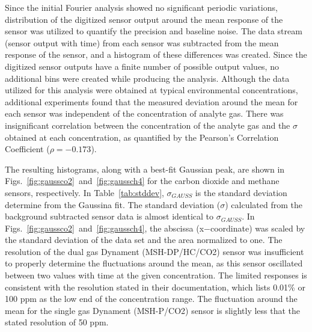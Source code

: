 \documentclass[preprint,sort&compress]{elsarticle}
\begin{document}
			Since the initial Fourier analysis showed no significant periodic variations, distribution of the digitized sensor output around the mean response of the sensor was utilized to quantify the precision and baseline noise.
			The data stream (sensor output with time) from each sensor was subtracted from the mean response of the sensor, and a histogram of these differences was created. Since the digitized sensor outputs have a finite number of possible output values, no additional bins were created while producing the analysis.
			Although the data utilized for this analysis were obtained at typical environmental concentrations, additional experiments found that the measured deviation around the mean for each sensor was independent of the concentration of analyte gas.
			There was insignificant correlation between the concentration of the analyte gas and the $\sigma$ obtained at each concentration, as quantified by the Pearson's Correlation Coefficient ($\rho=-0.173$).
			

			The resulting histograms, along with a best-fit Gaussian peak, are shown in Figs.~\ref{fig:gaussco2}~and~\ref{fig:gaussch4} for the carbon dioxide and methane sensors, respectively.
			In Table~\ref{tab:stddev}, $\sigma_{GAUSS}$ is the standard deviation determine from the Gaussina fit.
			The standard deviation ($\sigma$) calculated from the background subtracted sensor data is almost identical to $\sigma_{GAUSS}$.
			In Figs.~\ref{fig:gaussco2}~and~\ref{fig:gaussch4}, the abscissa (x$-$coordinate) was scaled by the standard deviation of the data set and the area normalized to one.
			The resolution of the dual gas Dynament (MSH-DP/HC/CO2) sensor was insufficient to properly determine the fluctuations around the mean, as this sensor oscillated between two values with time at the given concentration.
			The limited responses is consistent with the resolution stated in their documentation, which lists 0.01\% or 100 ppm as the low end of the concentration range.
			The fluctuation around the mean for the single gas Dynament (MSH-P/CO2) sensor is slightly less that the stated resolution of 50 ppm.
			
\end{document}
